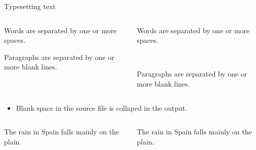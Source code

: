 \documentclass[,aspectratio=43]{beamer}
\newcommand{\VERB}{\Verb[commandchars=\\\{\}]}
\newenvironment{Shaded}{\begin{snugshade}}{\end{snugshade}}
\newcommand{\ExtensionTok}[1]{#1}
\newcommand{\KeywordTok}[1]{\textcolor[rgb]{0.00,0.44,0.13}{\textbf{#1}}}
\newcommand{\NormalTok}[1]{#1}
\providecommand{\tightlist}{%
  \setlength{\itemsep}{0pt}\setlength{\parskip}{0pt}}
\begin{document}
\begin{frame}[fragile]{Typesetting text}
\protect\hypertarget{typesetting-text}{}

\begin{columns}[T]
\begin{column}{0.48\textwidth}
\vspace{-1em}

\begin{Shaded}
\begin{Highlighting}[]
\NormalTok{Words are separated by one }
\NormalTok{or more spaces.}

\NormalTok{Paragraphs are separated by }
\NormalTok{one or more blank lines.}
\end{Highlighting}
\end{Shaded}
\end{column}

\begin{column}{0.48\textwidth}
Words are separated by one or more spaces.

~

Paragraphs are separated by one or more blank lines.
\end{column}
\end{columns}

\vspace{0.5em}

\begin{itemize}
\tightlist
\item
  Blank space in the source file is collaped in the output.
\end{itemize}

\begin{columns}[T]
\begin{column}{0.48\textwidth}
\vspace{-1em}

\begin{Shaded}
\begin{Highlighting}[]
\NormalTok{The      rain    in   Spain}
\NormalTok{falls mainly on the   plain.}
\end{Highlighting}
\end{Shaded}
\end{column}

\begin{column}{0.48\textwidth}
The rain in Spain falls mainly on the plain.
\end{column}
\end{columns}
\end{frame}
\end{document}
